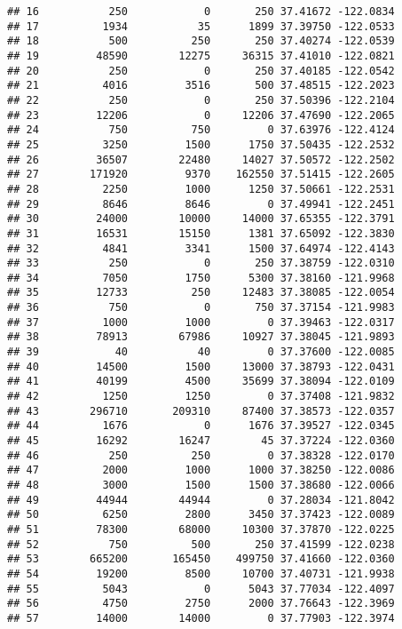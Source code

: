 \documentclass[
]{book}
\begin{document}
\begin{verbatim}
## 16           250            0       250 37.41672 -122.0834
## 17          1934           35      1899 37.39750 -122.0533
## 18           500          250       250 37.40274 -122.0539
## 19         48590        12275     36315 37.41010 -122.0821
## 20           250            0       250 37.40185 -122.0542
## 21          4016         3516       500 37.48515 -122.2023
## 22           250            0       250 37.50396 -122.2104
## 23         12206            0     12206 37.47690 -122.2065
## 24           750          750         0 37.63976 -122.4124
## 25          3250         1500      1750 37.50435 -122.2532
## 26         36507        22480     14027 37.50572 -122.2502
## 27        171920         9370    162550 37.51415 -122.2605
## 28          2250         1000      1250 37.50661 -122.2531
## 29          8646         8646         0 37.49941 -122.2451
## 30         24000        10000     14000 37.65355 -122.3791
## 31         16531        15150      1381 37.65092 -122.3830
## 32          4841         3341      1500 37.64974 -122.4143
## 33           250            0       250 37.38759 -122.0310
## 34          7050         1750      5300 37.38160 -121.9968
## 35         12733          250     12483 37.38085 -122.0054
## 36           750            0       750 37.37154 -121.9983
## 37          1000         1000         0 37.39463 -122.0317
## 38         78913        67986     10927 37.38045 -121.9893
## 39            40           40         0 37.37600 -122.0085
## 40         14500         1500     13000 37.38793 -122.0431
## 41         40199         4500     35699 37.38094 -122.0109
## 42          1250         1250         0 37.37408 -121.9832
## 43        296710       209310     87400 37.38573 -122.0357
## 44          1676            0      1676 37.39527 -122.0345
## 45         16292        16247        45 37.37224 -122.0360
## 46           250          250         0 37.38328 -122.0170
## 47          2000         1000      1000 37.38250 -122.0086
## 48          3000         1500      1500 37.38680 -122.0066
## 49         44944        44944         0 37.28034 -121.8042
## 50          6250         2800      3450 37.37423 -122.0089
## 51         78300        68000     10300 37.37870 -122.0225
## 52           750          500       250 37.41599 -122.0238
## 53        665200       165450    499750 37.41660 -122.0360
## 54         19200         8500     10700 37.40731 -121.9938
## 55          5043            0      5043 37.77034 -122.4097
## 56          4750         2750      2000 37.76643 -122.3969
## 57         14000        14000         0 37.77903 -122.3974

\end{verbatim}
\end{document}
